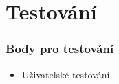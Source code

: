 
\chapter{Testování}

\subsection{Body pro testování}
\begin{itemize}
    \item Uživatelské testování
\end{itemize}

